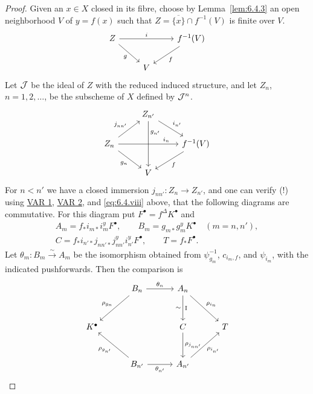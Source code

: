 \begin{proof}
Given an $x\in X$ closed in its fibre, choose by Lemma~\ref{lem:6.4.3} an open neighborhood $V$ of $y=f(x)$ such that $Z = \overline{\{x\}}\cap f^{-1}(V)$ is finite over $V$.
\[
\begin{tikzcd}
Z \ar[rr,"i"] \ar[dr,"g"'] && f^{-1}(V) \ar[dl,"f"] \\
&V
\end{tikzcd}
\]
Let $\mathcal{J}$ be the ideal of $Z$ with the reduced induced structure, and let $Z_n$, $n=1,2,\dots$, be the subscheme of $X$ defined by $\mathcal{J}^{n}$.
\[
\begin{tikzcd}
& Z_{n'} \ar[rd,"i_{n'}"] \ar[dd,"g_{n'}",near start] & \\
Z_n \ar[ru,"j_{nn'}"] \ar[rr,"i_n",pos=0.8] \ar[rd,"g_n"'] && f^{-1}(V) \ar[ld,"f"] \\
&V&
\end{tikzcd}
\]
For $n<n'$ we have a closed immersion $j_{nn'}\colon Z_n\to Z_{n'}$, and one can verify (!) using \hyperref[var:6.3.1]{VAR 1}, \hyperref[var:6.3.2]{VAR 2}, and \eqref{eq:6.4.viii} above, that the following diagrams are commutative.
For this diagram put $F^\bullet=f^\Delta K^\bullet$ and
\[
\begin{gathered}
A_m=f_*i_{m*}i_m^y F^\bullet,\qquad B_m=g_{m*}g_m^y K^\bullet\quad(m=n,n'),\\
C=f_*i_{n'*}j_{nn'*}j_{nn'}^y i_{n'}^y F^\bullet,\qquad T=f_*F^\bullet.
\end{gathered}
\]
Let $\theta_m\colon B_m\xrightarrow{\sim}A_m$ be the isomorphism obtained from $\psi_{g_m}^{-1}$, $c_{i_m,f}$, and $\psi_{i_m}$, with the indicated pushforwards. Then the comparison is
\[
\begin{tikzcd}[column sep=3em,row sep=3em]
& B_n \ar[r,"\theta_n"] \ar[dl,"\rho_{g_n}"'] & A_n \ar[d,"\mathrm{I}","\sim"'] \ar[dr,"\rho_{i_n}"] & \\
K^\bullet && C \ar[d,"\rho_{j_{nn'}}"] & T \\
& B_{n'} \ar[r,"\theta_{n'}"'] \ar[ul,"\rho_{g_{n'}}"] & A_{n'} \ar[ur,"\rho_{i_{n'}}"'] &
\end{tikzcd}
\]

\par\endgroup


\end{proof}
